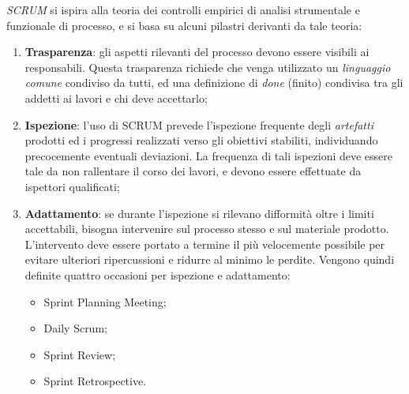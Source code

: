 \documentclass[../main.tex]{subfiles}
\begin{document}
        		\emph{SCRUM} si ispira alla teoria dei controlli empirici di analisi strumentale e funzionale di processo, e si basa su alcuni pilastri derivanti da tale teoria:
        		\begin{enumerate}
        			\item \textbf{Trasparenza}: gli aspetti rilevanti del processo devono essere visibili ai responsabili. Questa trasparenza richiede che venga utilizzato un \emph{linguaggio comune} condiviso da tutti, ed una definizione di
        			\emph{done} (finito) condivisa tra gli addetti ai lavori e chi deve accettarlo;
        			\item \textbf{Ispezione}: l'uso di SCRUM prevede l'ispezione frequente degli \emph{artefatti} prodotti ed i progressi realizzati verso gli obiettivi stabiliti, individuando precocemente eventuali deviazioni. La frequenza di tali ispezioni deve essere tale da non rallentare il corso dei lavori, e devono essere effettuate da ispettori qualificati;
        			\item \textbf{Adattamento}: se durante l'ispezione si rilevano difformità oltre i limiti accettabili, bisogna intervenire sul processo stesso e sul materiale prodotto. L'intervento deve essere portato a termine il più velocemente possibile per evitare ulteriori ripercussioni e ridurre al minimo le perdite. Vengono quindi definite quattro occasioni per ispezione e adattamento:
        			\begin{itemize}
        				\item Sprint Planning Meeting;
        				\item Daily Scrum;
        				\item Sprint Review;
        				\item Sprint Retrospective.
        			\end{itemize}
        		\end{enumerate}
        	
\end{document}
